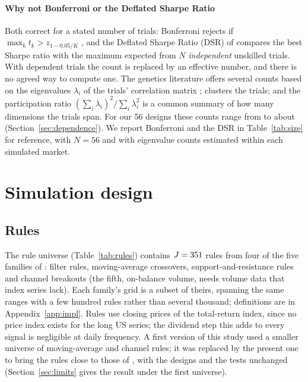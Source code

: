 \documentclass[pdflatex,sn-basic]{sn-jnl}
\theoremstyle{thmstyleone}
\theoremstyle{thmstylethree}
\newcommand{\tabpath}{../tables/tex}
\begin{document}
\paragraph{Why not Bonferroni or the Deflated Sharpe Ratio} Both correct for a stated number of trials:
Bonferroni rejects if $\max_k t_k>z_{1-0.05/K}$ \citep{dunn1961}, and the Deflated Sharpe Ratio (DSR)
of \citet{bailey2014dsr} compares the best Sharpe ratio with the maximum expected from $N$
\emph{independent} unskilled trials. With dependent trials the count is replaced by an effective number,
and there is no agreed way to compute one. The genetics literature offers several counts based on the
eigenvalues $\lambda_i$ of the trials' correlation matrix \citep{nyholt2004,li2005,galwey2009};
\citet{lopezdeprado2019} clusters the trials; and the participation ratio
$(\sum_i\lambda_i)^2/\sum_i\lambda_i^2$ is a common summary of how many dimensions the trials span. For
our 56 designs these counts range from \NumNeffD{} to about \NumNeffNyholtRound{}
(Section~\ref{sec:dependence}). We report Bonferroni and the DSR in Table~\ref{tab:size} for reference,
with $N=56$ and with eigenvalue counts estimated within each simulated market.

\section{Simulation design}\label{sec:design}

\subsection{Rules}

\begin{table}[tbp]
\caption{The \NumRules{} trading rules: four of the five families of \citet{sullivan1999}, with the
parameter grid of each family.}
\label{tab:rules}

\end{table}

The rule universe (Table~\ref{tab:rules}) contains $J=351$ rules from four of the five families of
\citet{sullivan1999}: filter rules, moving-average crossovers, support-and-resistance rules and channel
breakouts (the fifth, on-balance volume, needs volume data that index series lack). Each family's grid
is a subset of theirs, spanning the same ranges with a few hundred rules rather than several thousand;
definitions are in Appendix~\ref{app:impl}. Rules use closing prices of the total-return index, since no
price index exists for the long US series; the dividend step this adds to every signal is negligible at
daily frequency. A first version of this study used a smaller universe of \NumOldRules{} moving-average
and channel rules; it was replaced by the present one to bring the rules close to those of
\citet{sullivan1999}, with the designs and the tests unchanged (Section~\ref{sec:limits} gives the
result under the first universe).
\end{document}
